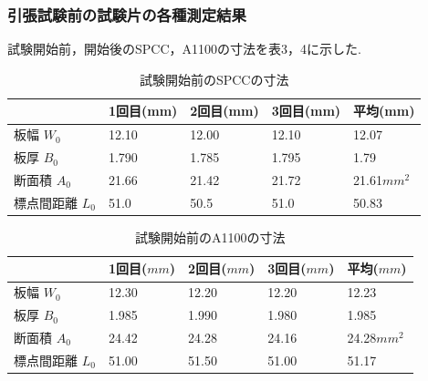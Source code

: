 \documentclass[10pt，a4j]{jsarticle}
\begin{document}
  \subsubsection{引張試験前の試験片の各種測定結果}
    試験開始前，開始後のSPCC，A1100の寸法を表3，4に示した.
    \begin{table}[H]
      \centering
      \caption{試験開始前のSPCCの寸法}
      \label{my-label}
        \footnotesize
        \begin{tabular}{lllll}
                      & 1回目(mm) & 2回目(mm) & 3回目(mm) & 平均(mm) \\ \hline
        板幅 $W_{0}$    & 12.10   & 12.00   & 12.10   & 12.07  \\
        板厚 $B_{0}$    & 1.790   & 1.785   & 1.795   & 1.79   \\
        断面積 $A_{0}$   & 21.66   & 21.42   & 21.72   & 21.61$mm^{2}$  \\
        標点間距離 $L_{0}$ & 51.0    & 50.5    & 51.0    & 50.83 
      \end{tabular}
    \end{table}
    \begin{table}[H]
      \centering
      \caption{試験開始前のA1100の寸法}
      \label{my-label}
      \footnotesize
      \begin{tabular}{lllll}
                      & 1回目($mm$) & 2回目($mm$) & 3回目($mm$) & 平均($mm$) \\ \hline
        板幅 $W_{0}$    & 12.30   & 12.20   & 12.20   & 12.23  \\
        板厚 $B_{0}$    & 1.985   & 1.990   & 1.980   & 1.985  \\
        断面積 $A_{0}$   & 24.42   & 24.28   & 24.16   & 24.28$mm^{2}$  \\
        標点間距離 $L_{0}$ & 51.00   & 51.50   & 51.00   & 51.17 
      \end{tabular}
    \end{table}
\end{document}
